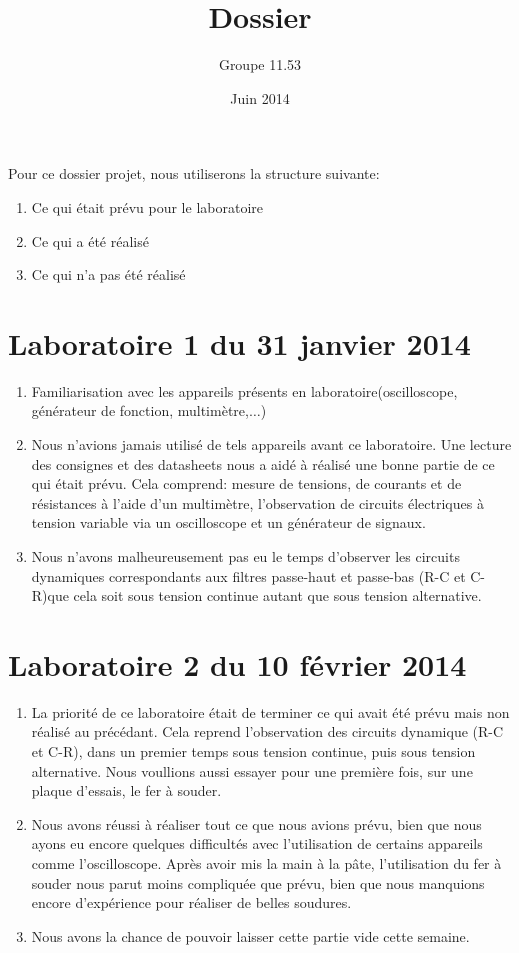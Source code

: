 \documentclass{report}
\title{Dossier}
\author{Groupe 11.53}
\date{Juin 2014}
\begin{document}
 
\maketitle

Pour ce dossier projet, nous utiliserons la structure suivante:
\begin{enumerate}
\item Ce qui était prévu pour le laboratoire
\item Ce qui a été réalisé
\item Ce qui n'a pas été réalisé
\end{enumerate}

\section{Laboratoire 1 du 31 janvier 2014}
\begin{enumerate}
\item 
 Familiarisation avec les appareils présents en laboratoire(oscilloscope, générateur de fonction, multimètre,$\dots$)
\item 
 Nous n'avions jamais utilisé de tels appareils avant ce laboratoire. Une lecture des consignes et des datasheets nous a aidé à réalisé une bonne partie de ce qui était prévu. Cela comprend: mesure de tensions, de courants et de résistances à l'aide d'un multimètre, l'observation de circuits électriques à tension variable via un oscilloscope et un générateur de signaux. 
\item 
 Nous n'avons malheureusement pas eu le temps d'observer les circuits dynamiques correspondants aux filtres passe-haut et passe-bas (R-C et C-R)que cela soit sous tension continue autant que sous tension alternative.

\end{enumerate}

\section{Laboratoire 2 du 10 février 2014}
\begin{enumerate}
\item 
La priorité de ce laboratoire était de terminer ce qui avait été prévu mais non réalisé au précédant. Cela reprend l'observation des circuits dynamique (R-C et C-R), dans un premier temps sous tension continue, puis sous tension alternative. Nous voullions aussi essayer pour une première fois, sur une plaque d'essais, le fer à souder.

\item
 Nous avons réussi à réaliser tout ce que nous avions prévu, bien que nous ayons eu encore quelques difficultés avec l'utilisation de certains appareils comme l'oscilloscope. Après avoir mis la main à la pâte, l'utilisation du fer à souder nous parut moins compliquée que prévu, bien que nous manquions encore d'expérience pour réaliser de belles soudures.

\item 
Nous avons la chance de pouvoir laisser cette partie vide cette semaine.
\end{enumerate}
\end{document}
